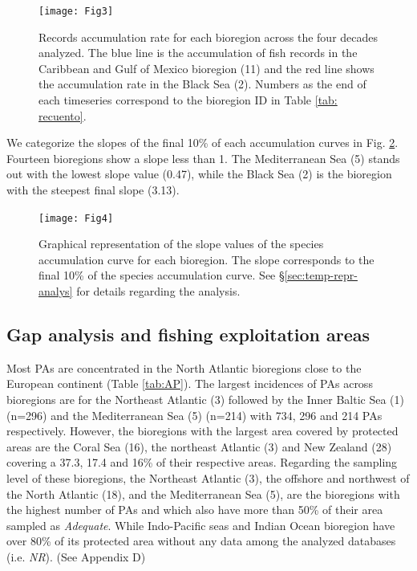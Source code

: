 \documentclass[12pt,authoryear]{elsarticle}
\begin{document}
\begin{figure}[h]
  \centering
  \texttt{[image: Fig3]}
  \caption{Records accumulation rate for each bioregion across the four decades analyzed. The blue line is the  accumulation of fish records  in the Caribbean and Gulf of Mexico bioregion (11) and the red line shows the accumulation rate in the Black Sea (2). Numbers as the end of each timeseries correspond to the bioregion ID in Table \ref{tab: recuento}.}
  \label{fig:record-accumlation}
\end{figure}

We categorize the slopes of the final 10\% of each accumulation curves  in Fig. \ref{fig:Slopefinal}. Fourteen bioregions show a slope less than 1. The Mediterranean Sea (5) stands out with the lowest slope value (0.47), while the Black Sea (2) is the bioregion with the steepest final slope (3.13). 

\begin{figure}
  \centering
  \texttt{[image: Fig4]}
    \caption{Graphical representation of the slope values of the species accumulation curve  for each bioregion. The slope corresponds to the final 10\%  of the species accumulation curve. See \S \ref{sec:temp-repr-analys} for details regarding the analysis.}
     \label{fig:Slopefinal}
\end{figure}

\subsection{Gap analysis and fishing exploitation areas}
\label{sec:GAP}

Most PAs are concentrated in the North Atlantic bioregions close to the European continent (Table \ref{tab:AP}). The largest incidences of PAs across bioregions are for the Northeast Atlantic (3) followed by the Inner Baltic Sea (1) (n=296) and the Mediterranean Sea (5) (n=214) with 734, 296 and 214 PAs respectively. However, the bioregions with the largest area covered by protected areas are the Coral Sea (16), the northeast Atlantic (3) and New Zealand (28) covering a 37.3, 17.4 and 16\% of their respective areas.
Regarding the sampling level of these bioregions, the Northeast Atlantic (3), the offshore and northwest of the North Atlantic (18), and the Mediterranean Sea (5), are the bioregions with the highest number of PAs and which also have more than 50\% of their area sampled as \textit{Adequate}. While Indo-Pacific seas and Indian Ocean bioregion have over 80\% of its protected area without any data among the analyzed databases (i.e. \textit{NR}). (See Appendix D)
\end{document}
